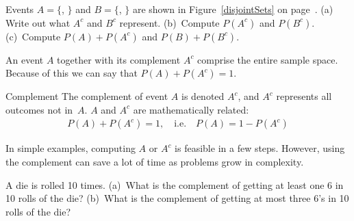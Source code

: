 \D{\newpage}

\begin{exercisewrap}
\begin{nexercise}
Events $A=\{$, $\}$ and $B=\{$, $\}$ are shown in Figure~\ref{disjointSets} on page~\pageref{disjointSets}. (a) Write out what $A^c$ and $B^c$ represent. (b)~Compute $P(A^c)$ and $P(B^c)$. (c)~Compute $P(A)+P(A^c)$ and $P(B)+P(B^c)$.\footnotemark\end{nexercise}
\end{exercisewrap}


An event $A$ together with its complement $A^c$ comprise the entire sample space. Because of this we can say that $P(A) + P(A^c) = 1$.

\begin{onebox}{Complement}
The complement of event $A$ is denoted $A^c$, and $A^c$ represents all outcomes not in~$A$. $A$ and $A^c$ are mathematically related: \vspace{-2mm}
\begin{eqnarray*}\label{complement}
P(A) + P(A^c) = 1, \quad\text{i.e.}\quad P(A) = 1-P(A^c)
\end{eqnarray*}\vspace{-6.5mm}\end{onebox}

In simple examples, computing $A$ or $A^c$ is feasible in a few steps. However, using the complement can save a lot of time as problems grow in complexity.

\begin{exercisewrap}
\begin{nexercise}
A die is rolled 10 times. (a)~What is the complement of getting at least one 6 in 10 rolls of the die? (b)~What is the complement of getting at most three 6's in 10 rolls of the die?\footnotemark
\end{nexercise}
\end{exercisewrap}


